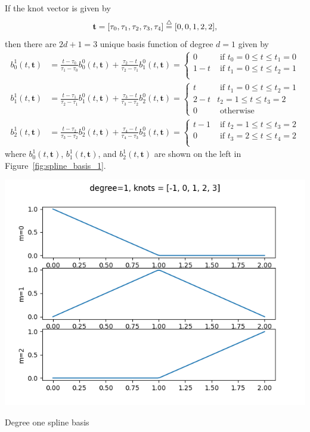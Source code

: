 \clearpage


\par{}

If the knot vector is given by
\[
\mathbf{t} = [\tau_0, \tau_1, \tau_2, \tau_3, \tau_4] \stackrel{\triangle}{=} [0, 0, 1, 2, 2],
\]
then there are $2d+1=3$ unique basis function of degree $d=1$ given by
\begin{align*}
b_0^1(t,  \mathbf{t}) &= \frac{t-\tau_0}{\tau_1-\tau_0} b_0^0(t, \mathbf{t}) + \frac{\tau_2-t}{\tau_2-\tau_1}b_1^0(t,  \mathbf{t}) 
	= \begin{cases} 0   & \text{~if~} t_0=0 \leq t \leq t_1=0 \\
				    1-t & \text{~if~} t_1=0 \leq t \leq t_2=1 \\ 
 	  \end{cases}
\\ 
b_1^1(t,  \mathbf{t}) &= \frac{t-\tau_1}{\tau_2-\tau_1} b_1^0(t, \mathbf{t}) + \frac{\tau_3-t}{\tau_3-\tau_2}b_2^0(t,  \mathbf{t})
	= \begin{cases} t & \text{~if~} t_1=0 \leq t \leq t_2=1 \\ 
 									2-t & t_2=1 \leq t \leq t_3=2 \\
 									0 & \text{~otherwise}
 					    \end{cases}
\\ 
b_2^1(t,  \mathbf{t}) &= \frac{t-\tau_2}{\tau_3-\tau_2} b_2^0(t, \mathbf{t}) + \frac{\tau_4-t}{\tau_4-\tau_3}b_3^0(t,  \mathbf{t})
	= \begin{cases} t-1 & \text{~if~} t_2=1 \leq t \leq t_3=2 \\ 
 					0 & \text{~if~} t_3=2 \leq t \leq t_4=2 \\
 	  \end{cases}
\end{align*}
where $b_0^1(t,  \mathbf{t})$, $b_1^1(t,  \mathbf{t})$, and $b_2^1(t,  \mathbf{t})$ are shown on the left in Figure~\ref{fig:spline_basis_1}.
\begin{marginfigure}[-2in]
  	\includegraphics[width=\linewidth]{./chap5_trajectory_planning/figures/spline_basis_1}
  \caption{Degree one spline basis}
  \label{fig:spline_basis_1}  
\end{marginfigure}
